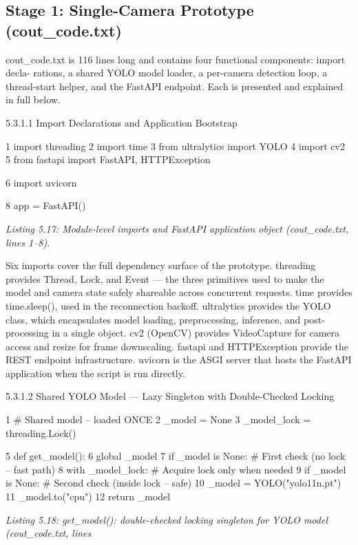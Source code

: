 \subsection{Stage 1: Single-Camera Prototype (cout\_code.txt)}


cout\_code.txt is 116 lines long and contains four functional components: import decla-
rations, a shared YOLO model loader, a per-camera detection loop, a thread-start helper,
and the FastAPI endpoint. Each is presented and explained in full below.


5.3.1.1 Import Declarations and Application Bootstrap

1 import threading
2 import time
3 from ultralytics import YOLO
4 import cv2
5 from fastapi import FastAPI, HTTPException




6 import uvicorn

8 app = FastAPI()



\textit{Listing 5.17: Module-level imports and FastAPI application object (cout\_code.txt, lines 1--8).}



Six imports cover the full dependency surface of the prototype. threading provides
Thread, Lock, and Event --- the three primitives used to make the model and camera state
safely shareable across concurrent requests. time provides time.sleep(), used in the
reconnection backoff. ultralytics provides the YOLO class, which encapsulates model
loading, preprocessing, inference, and post-processing in a single object. cv2 (OpenCV)
provides VideoCapture for camera access and resize for frame downscaling. fastapi
and HTTPException provide the REST endpoint infrastructure. uvicorn is the ASGI
server that hosts the FastAPI application when the script is run directly.


5.3.1.2 Shared YOLO Model --- Lazy Singleton with Double-Checked Locking

1 \# Shared model -- loaded ONCE
2 \_model = None
3 \_model\_lock = threading.Lock()

5 def get\_model():
6 global \_model
7 if \_model is None: \# First check (no lock -- fast path)
8 with \_model\_lock: \# Acquire lock only when needed
9 if \_model is None: \# Second check (inside lock -- safe)
10 \_model = YOLO("yolo11n.pt")
11 \_model.to("cpu")
12 return \_model


\textit{Listing 5.18: get\_model(): double-checked locking singleton for YOLO model (cout\_code.txt, lines}

